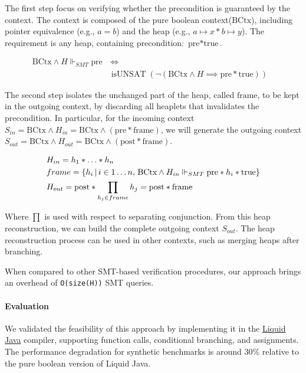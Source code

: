 \documentclass[sigplan,screen,review]{acmart}
\begin{document}
The first step focus on verifying whether the precondition is guaranteed by the context. The context is composed of the pure boolean context($\mbox{BCtx}$), including pointer equivalence (e.g., $a=b$) and the heap (e.g., $a \mapsto x * b \mapsto y$). The requirement is any heap, containing precondition: $\text{pre} * \text{true}$.

\begin{align*}
\mbox{BCtx} \wedge H \Vdash_{SMT} \mbox{pre} & \, \iff & \\ & \operatorname{isUNSAT}(\neg(\mbox{BCtx} \wedge H \implies \mbox{pre} \mathbin{*} \mbox{true} ))
\end{align*}



The second step isolates the unchanged part of the heap, called $\mbox{frame}$, to be kept in the outgoing context, by discarding all heaplets that invalidates the precondition. In particular, for the incoming context $S_{in} = \mbox{BCtx} \wedge H_{in} = \mbox{BCtx} \wedge (\text{pre} * \text{frame})$, we will generate the outgoing context $S_{out} = \text{BCtx} \wedge H_{out} = \text{BCtx} \wedge (\text{post} * \text{frame})$. 

\begin{align*}
&H_{in} = h_1 \mathbin{*} \dots \mathbin{*} h_n\\
&frame = \* \{ h_i  \,|\, i \in 1\dots n,\, \mbox{BCtx} \wedge H_{in} \Vdash_{SMT} \mbox{pre} \mathbin{*} h_i  \mathbin{*} \text{true} \}\\
&H_{out} = \text{post} \mathbin{*} \prod_{h_j \in frame} h_j = \text{post} \mathbin{*} \text{frame}
\end{align*}

Where $\prod$ is used with respect to separating conjunction. From this heap reconstruction, we can build the complete outgoing context $S_{out}$. The heap reconstruction process can be used in other contexts, such as merging heaps after branching.

When compared to other SMT-based verification procedures, our approach brings an overhead of \texttt{O(size(H))} SMT queries.

\paragraph{Evaluation} We validated the feasibility of this approach by implementing it in the \href{https://catarinagamboa.github.io/liquidjava.html}{Liquid Java} compiler, supporting function calls, conditional branching, and assignments. The performance degradation for synthetic benchmarks is around 30\% relative to the pure boolean version of Liquid Java.
\end{document}
